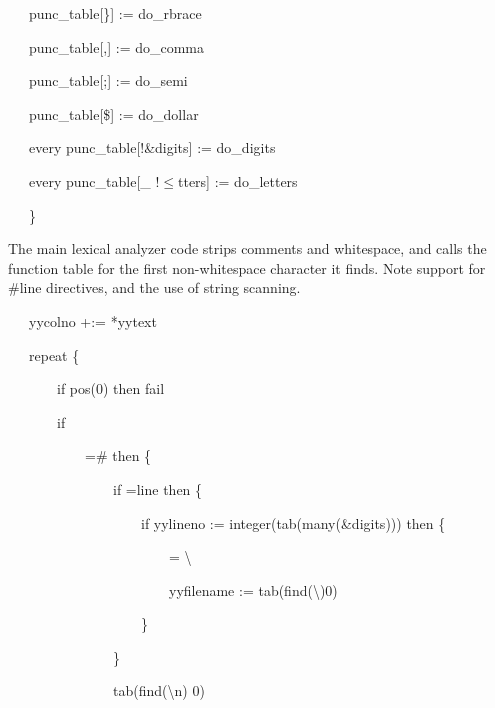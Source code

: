 {\ttfamily\mdseries
\ \ \ punc\_table[{\textquotedbl}\}{\textquotedbl}] := do\_rbrace}

{\ttfamily\mdseries
\ \ \ punc\_table[{\textquotedbl},{\textquotedbl}] := do\_comma}

{\ttfamily\mdseries
\ \ \ punc\_table[{\textquotedbl};{\textquotedbl}] := do\_semi}

{\ttfamily\mdseries
\ \ \ punc\_table[{\textquotedbl}\${\textquotedbl}] := do\_dollar}

{\ttfamily\mdseries
\ \ \ every punc\_table[!\&digits] := do\_digits}

{\ttfamily\mdseries
\ \ \ every punc\_table[{\textquotedbl}\_{\textquotedbl} {\textbar} !${\leq}$tters] := do\_letters}

{\ttfamily\mdseries
\ \ \ \}}


The main lexical analyzer code strips comments and whitespace, and calls the function table for the first non-whitespace
character it finds. Note support for \#line directives, and the use of string scanning. 

{\ttfamily\mdseries
\ \ \ yycolno +:= *yytext}


\bigskip

{\ttfamily\mdseries
\ \ \ repeat \{}

{\ttfamily\mdseries
\ \ \ \ \ \ \ if pos(0) then fail}

{\ttfamily\mdseries
\ \ \ \ \ \ \ if }

{\ttfamily\mdseries
\ \ \ \ \ \ \ \ \ \ \ ={\textquotedbl}\#{\textquotedbl} then \{}

{\ttfamily\mdseries
\ \ \ \ \ \ \ \ \ \ \ \ \ \ \ if ={\textquotedbl}line {\textquotedbl} then \{}

{\ttfamily\mdseries
\ \ \ \ \ \ \ \ \ \ \ \ \ \ \ \ \ \ \ if yylineno := integer(tab(many(\&digits))) then \{}

{\ttfamily\mdseries
\ \ \ \ \ \ \ \ \ \ \ \ \ \ \ \ \ \ \ \ \ \ \ ={\textquotedbl} {\textbackslash}{\textquotedbl}{\textquotedbl}}

{\ttfamily\mdseries
\ \ \ \ \ \ \ \ \ \ \ \ \ \ \ \ \ \ \ \ \ \ \ yyfilename :=
tab(find({\textquotedbl}{\textbackslash}{\textquotedbl}{\textquotedbl}){\textbar}0)}

{\ttfamily\mdseries
\ \ \ \ \ \ \ \ \ \ \ \ \ \ \ \ \ \ \ \}}

{\ttfamily\mdseries
\ \ \ \ \ \ \ \ \ \ \ \ \ \ \ \}}

{\ttfamily\mdseries
\ \ \ \ \ \ \ \ \ \ \ \ \ \ \ tab(find({\textquotedbl}{\textbackslash}n{\textquotedbl}) {\textbar} 0)}

